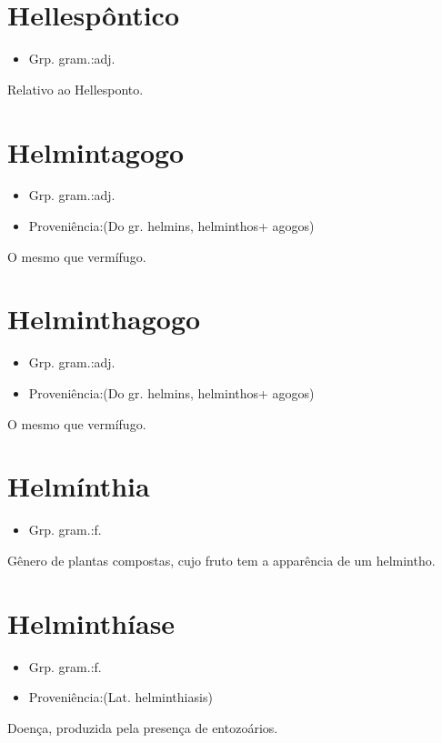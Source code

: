 \documentclass{article}
\begin{document}
\section{Hellespôntico}
\begin{itemize}
\item {Grp. gram.:adj.}
\end{itemize}
Relativo ao Hellesponto.
\section{Helmintagogo}
\begin{itemize}
\item {Grp. gram.:adj.}
\end{itemize}
\begin{itemize}
\item {Proveniência:(Do gr. \textunderscore helmins\textunderscore , \textunderscore helminthos\textunderscore  + \textunderscore agogos\textunderscore )}
\end{itemize}
O mesmo que \textunderscore vermífugo\textunderscore .
\section{Helminthagogo}
\begin{itemize}
\item {Grp. gram.:adj.}
\end{itemize}
\begin{itemize}
\item {Proveniência:(Do gr. \textunderscore helmins\textunderscore , \textunderscore helminthos\textunderscore  + \textunderscore agogos\textunderscore )}
\end{itemize}
O mesmo que \textunderscore vermífugo\textunderscore .
\section{Helmínthia}
\begin{itemize}
\item {Grp. gram.:f.}
\end{itemize}
Gênero de plantas compostas, cujo fruto tem a apparência de um helmintho.
\section{Helminthíase}
\begin{itemize}
\item {Grp. gram.:f.}
\end{itemize}
\begin{itemize}
\item {Proveniência:(Lat. \textunderscore helminthiasis\textunderscore )}
\end{itemize}
Doença, produzida pela presença de entozoários.
\end{document}
